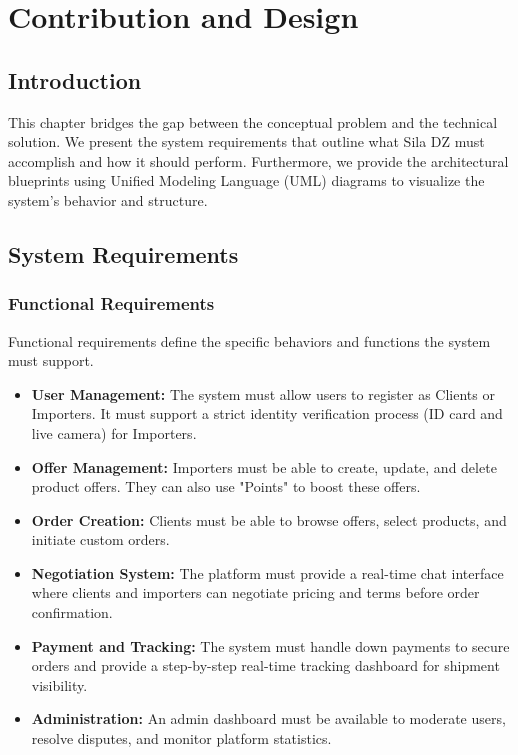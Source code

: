 \chapter{Contribution and Design}

\section{Introduction}
This chapter bridges the gap between the conceptual problem and the technical solution. We present the system requirements that outline what Sila DZ must accomplish and how it should perform. Furthermore, we provide the architectural blueprints using Unified Modeling Language (UML) diagrams to visualize the system's behavior and structure.

\section{System Requirements}

\subsection{Functional Requirements}
Functional requirements define the specific behaviors and functions the system must support.
\begin{itemize}
    \item \textbf{User Management:} The system must allow users to register as Clients or Importers. It must support a strict identity verification process (ID card and live camera) for Importers.
    \item \textbf{Offer Management:} Importers must be able to create, update, and delete product offers. They can also use "Points" to boost these offers.
    \item \textbf{Order Creation:} Clients must be able to browse offers, select products, and initiate custom orders.
    \item \textbf{Negotiation System:} The platform must provide a real-time chat interface where clients and importers can negotiate pricing and terms before order confirmation.
    \item \textbf{Payment and Tracking:} The system must handle down payments to secure orders and provide a step-by-step real-time tracking dashboard for shipment visibility.
    \item \textbf{Administration:} An admin dashboard must be available to moderate users, resolve disputes, and monitor platform statistics.
\end{itemize}


